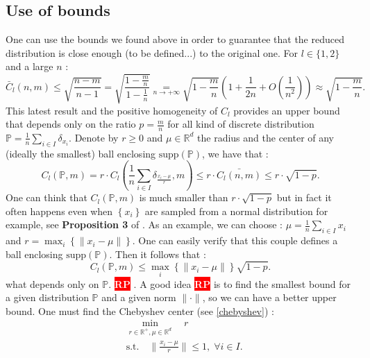 \documentclass{amsart}
\newcommand{\nb}[3]{
		{\colorbox{#2}{\bfseries\sffamily\tiny\textcolor{white}{#1}}}
		{\textcolor{#2}{\text{$\blacktriangleright$}{\textcolor{#2}{#3}}\text{$\blacktriangleleft$}}}}
\newcommand{\rp}[1]{\nb{RP}{red}{#1}}
\newcommand{\RR}{\mathbb{R}}
\begin{document}
\subsection{Use of bounds}
One can use the bounds we found above in order to guarantee that the reduced distribution is close enough (to be defined...) to the original one. For $l\in\{1,2\}$ and a large $n$ : $$\bar{C}_l\left(n,m \right)\leq \sqrt{\frac{n-m}{n-1}}=\sqrt{\frac{1-\frac{m}{n}}{1-\frac{1}{n}}}\underset{n \to +\infty}{=}\sqrt{1-\frac{m}{n}}(1+\frac{1}{2n}+O(\frac{1}{n^2}))\approx \sqrt{1-\frac{m}{n}}.$$
This latest result and the positive homogeneity of $C_l$ provides an upper bound that depends only on the ratio $p=\frac{m}{n}$ for all kind of discrete distribution $\mathbb{P}=\frac{1}{n}\sum_{i\in I}\delta_{x_i}$. Denote by $r\geq 0$ and $\mu\in\mathbb{R}^d$ the radius and the center of any  (ideally the smallest) ball enclosing $\text{supp}(\mathbb{P})$, we have that :
$$
C_l(\mathbb{P},m)=r\cdot C_l(\frac{1}{n}\sum_{i\in I}\delta_{\frac{x_i-\mu}{r}},m)\leq r\cdot \bar{C_l\left(n,m \right)}\leq r\cdot \sqrt{1-p}.
$$
One can think that $C_l(\mathbb{P},m)$ is much smaller than $r\cdot \sqrt{1-p}$ but in fact it often happens even when $\left\{x_i\right\}$ are sampled from a normal distribution for example, see \textbf{Proposition 3} of \cite{rujeerapaiboon_scenario_2022}.
As an example, we can choose : $\mu=\frac{1}{n}\sum_{i\in I}x_i$ and $r=\max_i\left\{{\lVert x_i-\mu\rVert}\right\}$. One can easily verify that this couple defines a ball enclosing $\text{supp}\left(\mathbb{P}\right)$. Then it follows that : 
$$
C_l(\mathbb{P},m)\leq \max_i\left\{{\lVert x_i-\mu\rVert}\right\}\sqrt{1-p}.
$$
what depends only on $\mathbb{P}$. \rp{maybe that helps a very little the article}. A good idea \rp{imo} is to find the smallest bound for a given distribution $\mathbb{P}$ and a given norm $\lVert\cdot\rVert$, so we can have a better upper bound. One must find the Chebyshev center (see \ref{chebyshev}) :
\begin{align*}
    &\min_{r\in\RR^+,\mu\in\RR^d} \quad r\\
    &\text{s.t.}\quad \lVert\frac{x_i-\mu}{r}\rVert \leq 1, \;\forall i\in I.
\end{align*}
\newline
\end{document}

